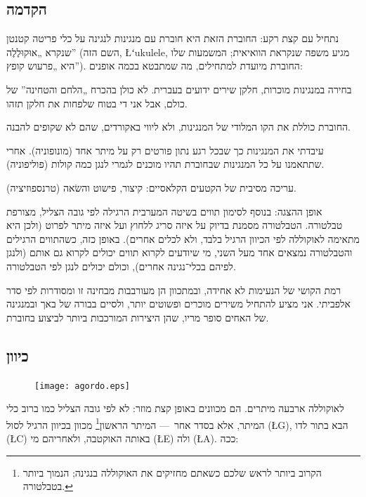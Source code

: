 \subsection*{הקדמה}

נתחיל עם קצת רקע: החוברת הזאת היא חוברת עם מנגינות לנגינה על כלי פריטה קטנטן שנקרא „אוּקוּלֶלֶה” (השם הזה, \L{{ʻ}ukulele}, מגיע משפה שנקראת הוואיאית; המשמעות שלו היא „פרעוש קופץ”). החוברת מיועדת למתחילים, מה שמתבטא בכמה אופנים:
\begin{compactitem}
	\item בחירה במנגינות מוכרות, חלקן שירים ידועים בעברית. לא כולן בהכרח „הלחם והטחינה” של כולם, אבל אני די בטוח שלפחות את חלקן תזהו.
	\item החוברת כוללת את הקו המלודי של המנגינות, ולא ליווי באקורדים, שהם לא שקופים להבנה.
	\item עיבדתי את המנגינות כך שבכל רגע נתון פורטים רק על מיתר אחד (מונופוניה). אחרי שתתאמנו על כל המנגינות שבחוברת תהיו מוכנים לגמרי לנגן כמה קולות (פוליפוניה).
	\item עריכה מסיבית של הקטעים הקלאסיים: קיצור, פישוט והשׂאה (טרנספוזיציה).
	\item אופן ההצגה: בנוסף לסימון תווים בשיטה המערבית הרגילה לפי גובה הצליל, מצורפת טבלטורה. הטבלטורה מסמנת בדיוק על איזה סריג ללחוץ ועל איזה מיתר לפרוט (ולכן היא מתאימה לאוקוללה לפי הכיוון הרגיל בלבד, ולא לכלים אחרים). באופן כזה, כשהתווים הרגילים והטבלטורה נמצאים אחד מעל השני, מי שיודעים לקרוא תווים יכולים לקרוא גם אותם (ולנגן לפיהם בכלי־נגינה אחרים), וכולם יכולים לנגן לפי הטבלטורה.
\end{compactitem}
רמת הקושי של הנעימות לא אחידה, ובמתכוון הן מעורבבות מבחינה זו ומסודרות לפי סדר אלפביתי. אני מציע להתחיל משירים מוכרים ופשוטים יותר, ולסיים בבורה של באך ובמנגינה של האחים סופר מריו, שהן היצירות המורכבות ביותר לביצוע בחוברת.



\subsection*{כיוון}

\begin{figure}\vspace{-2\baselineskip}
	\texttt{[image: agordo.eps]}\\
\end{figure}
לאוקוללה ארבעה מיתרים. הם מכוונים באופן קצת מוזר: לא לפי גובה הצליל כמו ברוב כלי המיתר, אלא בסדר אחר~— המיתר הראשון\footnote{הקרוב ביותר לראש שלכם כשאתם מחזיקים את האוקוללה בנגינה; הנמוך ביותר בטבלטורה.} מכוון בכיוון הרגיל לסול (\L{G}), הבא בתור לדו (\L{C}) באותה האוקטבה, ולאחריהם מי (\L{E}) ולה (\L{A}). ככה:


